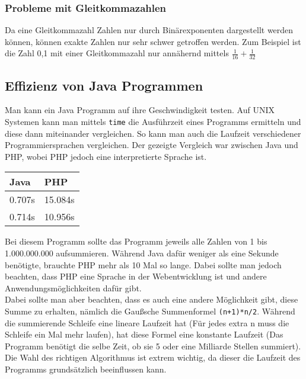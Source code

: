 \documentclass{article}
\begin{document}
	  \subsubsection{Probleme mit Gleitkommazahlen}
	  Da eine Gleitkommazahl Zahlen nur durch Binärexponenten dargestellt werden können, können exakte Zahlen nur sehr schwer getroffen werden. Zum Beispiel ist die Zahl 0,1 mit einer Gleitkommazahl nur annähernd mittels $\frac{1}{16} + \frac{1}{32}$
	  \subsection{Effizienz von Java Programmen}
	  Man kann ein Java Programm auf ihre Geschwindigkeit testen. Auf UNIX Systemen kann man mittels \verb|time| die Ausführzeit eines Programms ermitteln und diese dann miteinander vergleichen. So kann man auch die Laufzeit verschiedener Programmiersprachen vergleichen. Der gezeigte Vergleich war zwischen Java und PHP, wobei PHP jedoch eine interpretierte Sprache ist. \\
	  \begin{tabular}{| l | l |}
	  	\toprule
	  	Java & PHP  \\ \midrule
	  	0.707s & 15.084s \\ \hline
	  	0.714s & 10.956s \\
	  	\bottomrule
	  \end{tabular}
	  Bei diesem Programm sollte das Programm jeweils alle Zahlen von 1 bis 1.000.000.000 aufsummieren. Während Java dafür weniger als eine Sekunde benötigte, brauchte PHP mehr als 10 Mal so lange. Dabei sollte man jedoch beachten, dass PHP eine Sprache in der Webentwicklung ist und andere Anwendungsmöglichkeiten dafür gibt. \\
	  Dabei sollte man aber beachten, dass es auch eine andere Möglichkeit gibt, diese Summe zu erhalten, nämlich die Gaußsche Summenformel \verb|(n+1)*n/2|. Während die summierende Schleife eine lineare Laufzeit hat (Für jedes extra n muss die Schleife ein Mal mehr laufen), hat diese Formel eine konstante Laufzeit (Das Programm benötigt die selbe Zeit, ob sie 5 oder eine Milliarde Stellen summiert). Die Wahl des richtigen Algorithmus ist extrem wichtig, da dieser die Laufzeit des Programms grundsätzlich beeinflussen kann.
\end{document}
